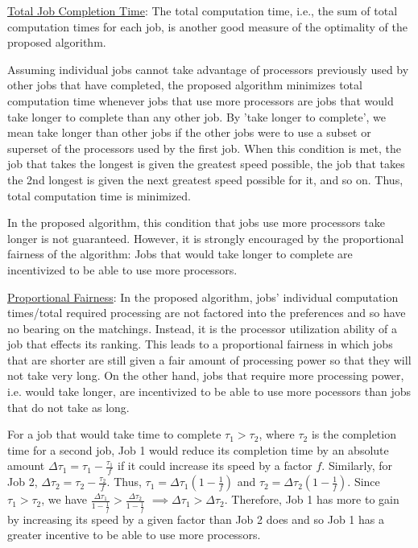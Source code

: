 \documentclass[conference]{IEEEtran}
\begin{document}
\underline{Total Job Completion Time}:
The total computation time, i.e., the 
sum of total computation times for each job,
is another good measure of the optimality 
of the proposed algorithm.

Assuming individual jobs cannot take advantage
of processors previously used by other jobs
that have completed, 
the proposed algorithm minimizes total 
computation time whenever 
jobs that use more processors are jobs that would take 
longer to complete than any other job. 
By 'take longer to complete', we mean take longer than
other jobs if the other jobs were to use a subset or 
superset of the processors used by the first job.
When this condition is met, the job that takes the
longest is given the greatest speed possible, the job that 
takes the 2nd longest is given the next greatest speed 
possible for it, and so on. 
Thus, total computation time is minimized.

In the proposed algorithm, this condition that jobs use
more processors take longer is not guaranteed.
However, it is strongly encouraged by the 
proportional fairness of the algorithm:
Jobs that would take longer to complete are incentivized
to be able to use more processors.

\underline{Proportional Fairness}:
In the proposed algorithm, jobs' individual computation
times/total required processing are not factored into
the preferences and so have no bearing on the matchings.
Instead, it is the processor utilization ability of 
a job that effects its ranking. This leads to a proportional
fairness in which jobs that are shorter are still given 
a fair amount of processing power so that they will not take
very long. 
On the other hand, jobs that
require more processing power, i.e. would take longer,
are incentivized to be able to use more pocessors than 
jobs that do not take as long.

For a job that would take time to complete 
\(\tau_1 > \tau_2\), where \(\tau_2\) is the
completion time for a second job,
Job 1 would reduce its completion time by an 
absolute amount 
\(\Delta \tau_1 = \tau_1-\frac{\tau_1}{f}\) 
if it could increase its speed by a factor \(f\).
Similarly, for Job 2, 
\(\Delta \tau_2 = \tau_2-\frac{\tau_2}{f}\).
Thus, 
\(\tau_1=\Delta \tau_1(1-\frac{1}{f})\)
and
\(\tau_2=\Delta \tau_2(1-\frac{1}{f})\).
Since 
\(\tau_1 > \tau_2\), we have
\(\frac{\Delta\tau_1}{1-\frac{1}{f}} > \frac{\Delta\tau_2}{1-\frac{1}{f}}\) 
\(\implies \Delta \tau_1 > \Delta \tau_2\).
Therefore, Job 1 has more to gain by increasing its speed by 
a given factor than Job 2 does and so Job 1 has a greater incentive
to be able to use more processors.
\end{document}
